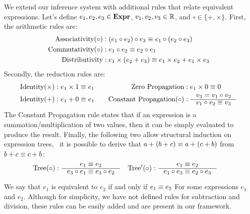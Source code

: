 We extend our inference system with additional rules that relate equivalent
expressions.  Let's define $e_1, e_2, e_3 \in \mathbf{Expr}$, $v_1, v_2, v_3 \in
\mathbb{R}$, and $\circ \in \{+, \times\}$.  First, the arithmetic rules are:
\begin{equation}
    \begin{aligned}
        \text{Associativity}(\circ)
            &: (e_1 \circ e_2) \circ e_3 \equiv e_1 \circ (e_2 \circ e_3) \\
        \text{Commutativity}(\circ)
            &: e_1 \circ e_2 \equiv e_2 \circ e_1 \\
        \text{Distributivity}
            &: e_1 \times (e_2 + e_3) \equiv e_1 \times e_2 + e_1 \times e_3
    \end{aligned}
    \label{so:eq:equivalence_arithmetic}
\end{equation}
Secondly, the reduction rules are:
\begin{equation}
    \begin{aligned}
        \text{Identity}(\times)
            &: e_1 \times 1 \eqrel e_1 \quad &
        \text{Zero Propagation}
            &: e_1 \times 0 \eqrel 0 \\
        \text{Identity}(+)
            &: e_1 + 0 \eqrel e_1 &
        \text{Constant Propagation}(\circ)
            &: \inference{v_3 = v_1 \circ v_2}{v_1 \circ v_2 \eqrel v_3}
    \end{aligned}
    \label{so:eq:equivalence_reduction}
\end{equation}
The Constant Propagation rule states that if an expression is a
summation/multiplication of two values, then it can be simply evaluated to
produce the result. Finally, the following two allow structural induction on
expression trees, \eg~it is possible to derive that $a + (b + c) \equiv a + (c
+ b)$ from $b + c \equiv c + b$:
\begin{equation}
    \begin{aligned}
        \text{Tree}(\circ)
            : \inference{e_1 \eqrel e_2}{e_3 \circ e_1 \eqrel e_3 \circ e_2}
        \quad &
        \text{Tree}^\prime(\circ)
            : \inference{e_1 \eqrel e_2}{e_1 \circ e_3 \eqrel e_2 \circ e_3}
    \end{aligned}
    \label{so:eq:equivalence_tree}
\end{equation}

We say that $e_1$ is equivalent to $e_2$ if and only if $e_1 \equiv e_2$ For
some expressions $e_1$ and $e_2$.  Although for simplicity, we have not defined
rules for subtraction and division, these rules can be easily added and are
present in our framework.


